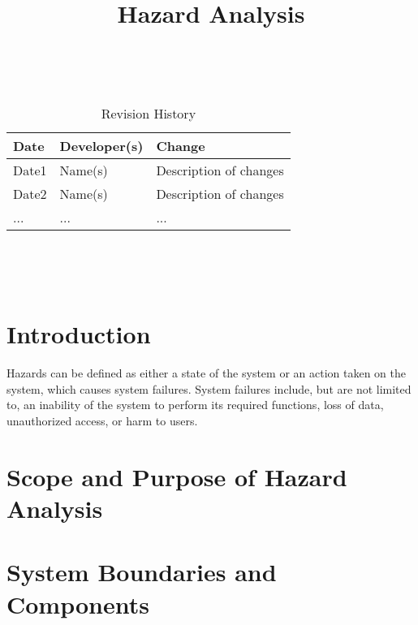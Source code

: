\documentclass{article}
\title{Hazard Analysis\\\progname}
\author{\authname}
\date{}
\begin{document}
\maketitle
\thispagestyle{empty}

~\newpage


\begin{table}[hp]
  \caption{Revision History} \label{TblRevisionHistory}
  \begin{tabularx}{\textwidth}{llX}
    \toprule
    \textbf{Date} & \textbf{Developer(s)} & \textbf{Change}\\
    \midrule
    Date1 & Name(s) & Description of changes\\
    Date2 & Name(s) & Description of changes\\
    ... & ... & ...\\
    \bottomrule
  \end{tabularx}
\end{table}

~\newpage

\tableofcontents

~\newpage



\section{Introduction}

Hazards can be defined as either a state of the system or an action
taken on the system, which causes system failures. System failures
include, but are not limited to, an inability of the system to
perform its required functions, loss of data, unauthorized access,
or harm to users.

\section{Scope and Purpose of Hazard Analysis}


\section{System Boundaries and Components}

\end{document}
